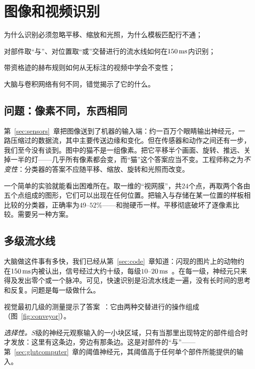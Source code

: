\chapter{图像和视频识别}
\label{sec:recognition}
\begin{chaptergoals}
\item 为什么识别必须忽略平移、缩放和光照，为什么模板匹配行不通；
\item 对部件取“与”、对位置取“或”交替进行的流水线如何在$150\,\text{ms}$内识别；
\item 带资格迹的赫布规则如何从无标注的视频中学会不变性；
\item 大脑与卷积网络有何不同，错觉揭示了它的什么。
\end{chaptergoals}

\section{问题：像素不同，东西相同}

第~\ref{sec:sensors}~章把图像送到了机器的输入端：约一百万个眼睛输出神经元，一路压缩过的数据流，其中主要传送边缘和变化。但在传感器和动作之间还有一步，我们至今没有谈到。图中的猫不是一组像素。把它平移半个画面、旋转、推远、关掉一半的灯——几乎所有像素都会变，而“猫”这个答案应当不变。工程师称之为\emph{不变性}：分类器的答案不应随平移、缩放、旋转和光照而改变。

一个简单的实验就能看出困难所在。取一维的“视网膜”，共$24$个点，再取两个各由五个点组成的图形，它们可以出现在任何位置。把输入与存储在某一位置的样板相比较的分类器，正确率为$49$--$52\%$——和抛硬币一样。平移彻底破坏了逐像素比较。需要另一种方案。

\section{多级流水线}

大脑做这件事有多快，我们已经从第~\ref{sec:code}~章知道：闪现的图片上的动物约在$150\,\text{ms}$内被认出，信号经过大约十级，每级$10$--$20\,\text{ms}$~\cite{Thorpe1996}。在每一级，神经元只来得及发出零个或一个脉冲。可见，快速识别是沿流水线走一遍，没有长时间的思考和反复。问题是每一级做什么。

视觉最初几级的测量提示了答案~\cite{HubelWiesel1962}：它由两种交替进行的操作组成（图~\ref{fig:conveyor}）。

\emph{选择性。}$S$级的神经元观察输入的一小块区域，只有当那里出现特定的部件组合时才发放：这里有这条边，旁边有那条边。这是对部件的“与”——第~\ref{sec:glutcomputer}~章的阈值神经元，其阈值高于任何单个部件所能提供的输入。

